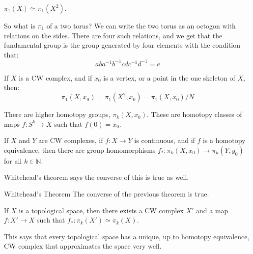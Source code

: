         \begin{theorem}
            $\pi_{1}(X)\simeq\pi_{1}(X^{2})$.
        \end{theorem}
        So what is $\pi_{1}$ of a two torus? We can write
        the two torus as an octogon with relations on the
        sides. There are four such relations, and we get
        that the fundamental group is the group generated by
        four elements with the condition that:
        \begin{equation}
            aba^{\minus{1}}b^{\minus{1}}
            cdc^{\minus{1}}d^{\minus{1}}=e
        \end{equation}
        \begin{theorem}
            If $X$ is a CW complex, and if
            $x_{0}$ is a vertex, or a point in the one skeleton
            of $X$, then:
            \begin{equation}
                \pi_{1}(X,x_{0})=\pi_{1}(X^{2},x_{0})
                =\pi_{1}(X,x_{0})/N
            \end{equation}
        \end{theorem}
        There are higher homotopy groups, $\pi_{k}(X,x_{0})$.
        These are homotopy classes of maps
        $f:S^{k}\rightarrow{X}$ such that $f(0)=x_{0}$.
        \begin{theorem}
            If $X$ and $Y$ are CW complexes, if
            $f:X\rightarrow{Y}$ is continuous, and if $f$ is
            a homotopy equivalence, then there are group
            homomorphisms
            $f_{*}:\pi_{k}(X,x_{0})\rightarrow{\pi}_{k}(Y,y_{0})$
            for all $k\in\mathbb{N}$.
        \end{theorem}
        Whitehead's theorem says the converse of this is true
        as well.
        \begin{ltheorem}{Whitehead's Theorem}
            The converse of the previous theorem is true.
        \end{ltheorem}
        \begin{theorem}
            If $X$ is a topological space, then there exists
            a CW complex $X'$ and a map
            $f:X'\rightarrow{X}$ such that
            $f_{*}:\pi_{k}(X')\simeq\pi_{k}(X)$.
        \end{theorem}
        This says that every topological space has a unique,
        up to homotopy equivalence, CW complex that approximates
        the space very well.
